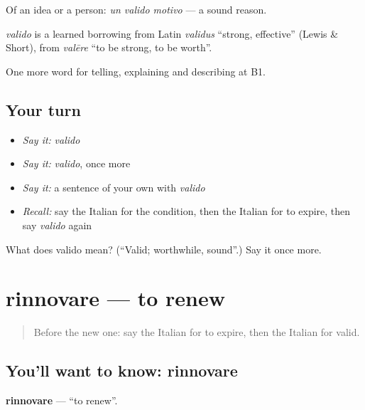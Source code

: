 Of an idea or a person: \emph{un valido motivo} — a sound reason.

\begin{cousinweb}
\emph{valido} is a learned borrowing from Latin \emph{validus} \textquotedblleft{}strong, effective\textquotedblright{} (Lewis \& Short), from \emph{valēre} \textquotedblleft{}to be strong, to be worth\textquotedblright{}.
\end{cousinweb}

\begin{grammarlens}[title={What you've built}]
One more word for telling, explaining and describing at B1.
\end{grammarlens}

\subsection*{Your turn}
\begin{itemize}
\raggedright
  \item \emph{Say it:} \emph{valido}
  \item \emph{Say it:} \emph{valido}, once more
  \item \emph{Say it:} a sentence of your own with \emph{valido}
  \item \emph{Recall:} say the Italian for the condition, then the Italian for to expire, then say \emph{valido} again
\end{itemize}

\begin{tcolorbox}[breakable,colback=teal!4,colframe=teal!35!black,title={Before you move on}]
What does valido mean? (\textquotedblleft{}Valid; worthwhile, sound\textquotedblright{}.) Say it once more.
\end{tcolorbox}
\section[rinnovare]{rinnovare — to renew}

\label{lesson:IT-C388-rinnovare}



\begin{quote}
Before the new one: say the Italian for to expire, then the Italian for valid.
\end{quote}

\subsection*{You'll want to know: rinnovare}
\textbf{rinnovare} — \textquotedblleft{}to renew\textquotedblright{}.

